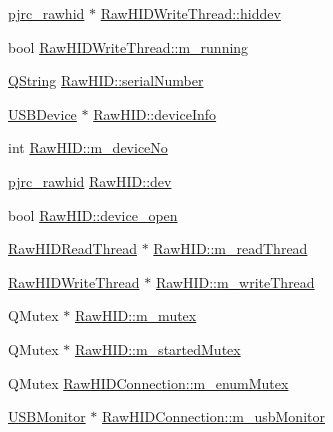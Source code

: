 \begin{DoxyCompactItemize}
\item 
\hyperlink{classpjrc__rawhid}{pjrc\-\_\-rawhid} $\ast$ \hyperlink{group___raw_h_i_d_plugin_ga7ce382fd2ebb17e10007aed01dea1d6f}{\-Raw\-H\-I\-D\-Write\-Thread\-::hiddev}
\item 
bool \hyperlink{group___raw_h_i_d_plugin_gaf4f4725b8f0b6ed4b9b5c751397d0abe}{\-Raw\-H\-I\-D\-Write\-Thread\-::m\-\_\-running}
\item 
\hyperlink{group___u_a_v_objects_plugin_gab9d252f49c333c94a72f97ce3105a32d}{\-Q\-String} \hyperlink{group___raw_h_i_d_plugin_ga0b5d9bd4ac69612199afa5b59dfc3ed6}{\-Raw\-H\-I\-D\-::serial\-Number}
\item 
\hyperlink{class_u_s_b_device}{\-U\-S\-B\-Device} $\ast$ \hyperlink{group___raw_h_i_d_plugin_gab9b0f096459d4bc5a220ac42e9465752}{\-Raw\-H\-I\-D\-::device\-Info}
\item 
int \hyperlink{group___raw_h_i_d_plugin_ga0dde2d900a5f9cbd059e528de3f0c73b}{\-Raw\-H\-I\-D\-::m\-\_\-device\-No}
\item 
\hyperlink{classpjrc__rawhid}{pjrc\-\_\-rawhid} \hyperlink{group___raw_h_i_d_plugin_ga4939588bf5bf31e39139a75ca4319884}{\-Raw\-H\-I\-D\-::dev}
\item 
bool \hyperlink{group___raw_h_i_d_plugin_ga6ec3ad7c063679816e5aafed60f677c3}{\-Raw\-H\-I\-D\-::device\-\_\-open}
\item 
\hyperlink{class_raw_h_i_d_read_thread}{\-Raw\-H\-I\-D\-Read\-Thread} $\ast$ \hyperlink{group___raw_h_i_d_plugin_gaecb703f979aac429ee3961f52c998b53}{\-Raw\-H\-I\-D\-::m\-\_\-read\-Thread}
\item 
\hyperlink{class_raw_h_i_d_write_thread}{\-Raw\-H\-I\-D\-Write\-Thread} $\ast$ \hyperlink{group___raw_h_i_d_plugin_ga103f382a48fee4b9fe034b3d88f45d42}{\-Raw\-H\-I\-D\-::m\-\_\-write\-Thread}
\item 
\-Q\-Mutex $\ast$ \hyperlink{group___raw_h_i_d_plugin_ga915d676c812135bc006e37a140a52365}{\-Raw\-H\-I\-D\-::m\-\_\-mutex}
\item 
\-Q\-Mutex $\ast$ \hyperlink{group___raw_h_i_d_plugin_ga62ee841aa1de86d73cfd1b9bc7a5d719}{\-Raw\-H\-I\-D\-::m\-\_\-started\-Mutex}
\item 
\-Q\-Mutex \hyperlink{group___raw_h_i_d_plugin_ga13d9bdfab2ab9e3a4f4cd08b53a2f105}{\-Raw\-H\-I\-D\-Connection\-::m\-\_\-enum\-Mutex}
\item 
\hyperlink{class_u_s_b_monitor}{\-U\-S\-B\-Monitor} $\ast$ \hyperlink{group___raw_h_i_d_plugin_ga03aaa7c95bd19c0d373b3c2b4e982cdb}{\-Raw\-H\-I\-D\-Connection\-::m\-\_\-usb\-Monitor}
\item 

\end{DoxyCompactItemize}
